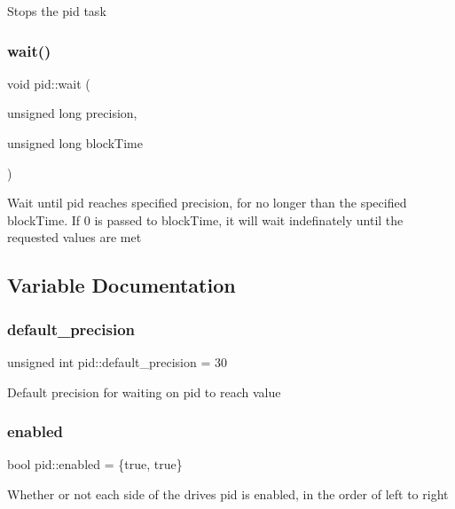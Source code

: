 Stops the pid task \mbox{\label{namespacepid_ae415ddecc97484b1195e22a89b429506}} 
\subsubsection{\texorpdfstring{wait()}{wait()}}
{\footnotesize\ttfamily void pid\+::wait (\begin{DoxyParamCaption}\item[{unsigned long}]{precision,  }\item[{unsigned long}]{block\+Time }\end{DoxyParamCaption})}

Wait until pid reaches specified precision, for no longer than the specified block\+Time. If 0 is passed to block\+Time, it will wait indefinately until the requested values are met 

\subsection{Variable Documentation}
\mbox{\label{namespacepid_ab7ebcf570abd665235d5edd4e78c1d2a}} 
\subsubsection{\texorpdfstring{default\+\_\+precision}{default\_precision}}
{\footnotesize\ttfamily unsigned int pid\+::default\+\_\+precision = 30}

Default precision for waiting on pid to reach value \mbox{\label{namespacepid_a210c97219b84549120ef7b0a27d75971}} 
\subsubsection{\texorpdfstring{enabled}{enabled}}
{\footnotesize\ttfamily bool pid\+::enabled = \{true, true\}}

Whether or not each side of the drive\textquotesingle{}s pid is enabled, in the order of left to right \mbox{\label{namespacepid_ab6d926f5578bc84849cd8306b32a7481}} 
